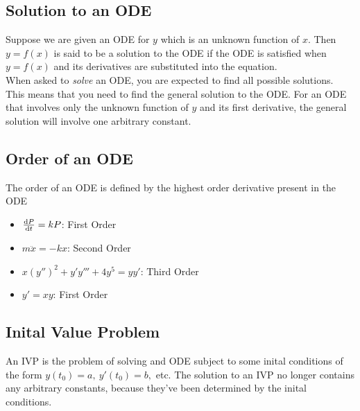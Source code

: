 \documentclass{report}
\begin{document}
\subsection*{Solution to an ODE}
Suppose we are given an ODE for $y$ which is an unknown function of $x$. Then $y=f(x)$ is said to be a solution to the ODE if the ODE is satisfied when $y=f(x)$ and its derivatives are substituted into the equation. \\

When asked to \textit{solve} an ODE, you are expected to find all possible solutions. This means that you need to find the general solution to the ODE. For an ODE that involves only the unknown function of $y$ and its first derivative, the general solution will involve one arbitrary constant.



\subsection*{Order of an ODE}
The order of an ODE is defined by the highest order derivative present in the ODE
\begin{itemize}
	\item $\dyd[P]{t} = kP$: First Order
	\item $m\ddot{x} = -kx$: Second Order
	\item $x(y'')^2 + y'y''' + 4y^5 = yy'$: Third Order
	\item $y'=xy$: First Order
\end{itemize}

\subsection*{Inital Value Problem}
An IVP is the problem of solving and ODE subject to some inital conditions of the form $y(t_0) = a,\ y'(t_0) = b,$ etc. The solution to an IVP no longer contains any arbitrary constants, because they've been determined by the inital conditions. 
\end{document}
